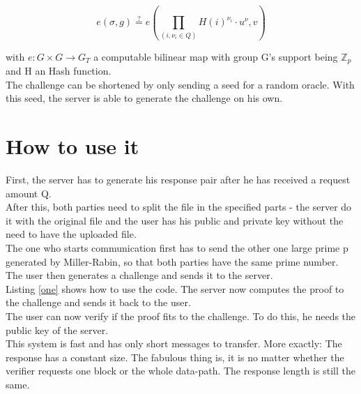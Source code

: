 \documentclass{amsart}
\begin{document}
\begin{equation}
e(\sigma, g) \overset{?}{=} e(\prod_{(i,\nu_{i} \in Q)} H(i)^{\nu_{i}} \cdot u^{\nu}, v)
\end{equation}

with $e: G \times G \rightarrow G_{T}$ a computable bilinear map with group G's support being $\mathbb{Z}_{p}$ and H an Hash function.\\

The challenge can be shortened by only sending a seed for a random oracle. With this seed, the server is able to generate the challenge on his own.



\section{How to use it}
First, the server has to generate his response pair after he has received a request amount Q.\\
After this, both parties need to split the file in the specified parts - the server do it with the original file and the user has his public and private key without the need to have the uploaded file.\\
The one who starts communication first has to send the other one large prime p generated by Miller-Rabin, so that both parties have the same prime number. The user then generates a challenge and sends it to the server.\\
Listing \ref{one} shows how to use the code. The server now computes the proof to the challenge and sends it back to the user. \\
The user can now verify if the proof fits to the challenge. To do this, he needs the public key of the server.\\

This system is fast and has only short messages to transfer. More exactly: The response has a constant size. The fabulous thing is, it is no matter whether the verifier requests one block or the whole data-path. The response length is still the same.\\
\end{document}
